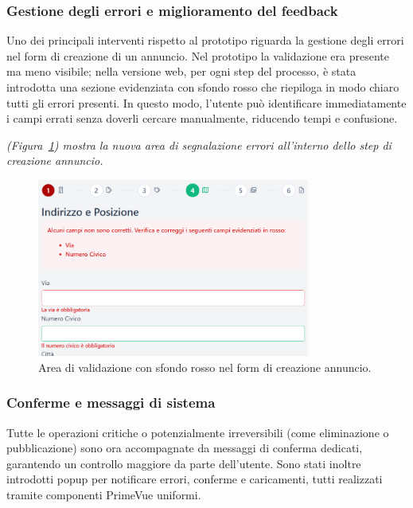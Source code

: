 \subsubsection*{Gestione degli errori e miglioramento del feedback}
Uno dei principali interventi rispetto al prototipo riguarda la gestione degli errori nel form di creazione di un annuncio.
Nel prototipo la validazione era presente ma meno visibile; nella versione web, per ogni step del processo, è stata introdotta una sezione evidenziata con sfondo rosso che riepiloga in modo chiaro tutti gli errori presenti.
In questo modo, l’utente può identificare immediatamente i campi errati senza doverli cercare manualmente, riducendo tempi e confusione.

\vspace{4pt}
\textit{(Figura~\ref{fig:errore-step}) mostra la nuova area di segnalazione errori all’interno dello step di creazione annuncio.}

\begin{figure}[H]
\centering
\includegraphics[width=0.8\textwidth]{Immagini/Expert Reviews/Sito/CreazioneAnnuncioConErrori.png}
\caption{Area di validazione con sfondo rosso nel form di creazione annuncio.}
\label{fig:errore-step}
\end{figure}

\subsubsection*{Conferme e messaggi di sistema}
Tutte le operazioni critiche o potenzialmente irreversibili (come eliminazione o pubblicazione) sono ora accompagnate da messaggi di conferma dedicati, garantendo un controllo maggiore da parte dell’utente.
Sono stati inoltre introdotti popup per notificare errori, conferme e caricamenti, tutti realizzati tramite componenti PrimeVue uniformi.

